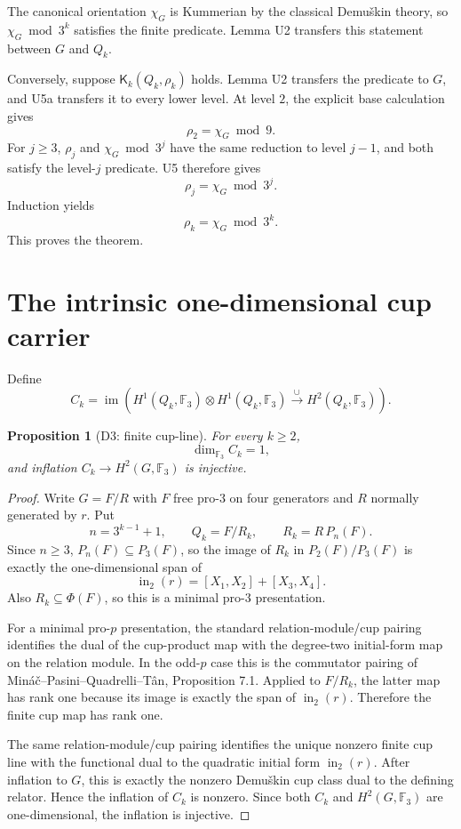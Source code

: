 \documentclass[11pt]{article}
\newtheorem{proposition}[theorem]{Proposition}
\begin{document}
The canonical orientation $\chi_G$ is Kummerian by the classical
Demu\v{s}kin theory, so $\chi_G\bmod3^k$ satisfies the finite predicate.
Lemma U2 transfers this statement between $G$ and $Q_k$.

Conversely, suppose $\mathsf K_k(Q_k,\rho_k)$ holds. Lemma U2 transfers
the predicate to $G$, and U5a transfers it to every lower level.
At level $2$, the explicit base calculation gives
\[
\rho_2=\chi_G\bmod9.
\]
For $j\ge3$, $\rho_j$ and $\chi_G\bmod3^j$ have the same reduction to
level $j-1$, and both satisfy the level-$j$ predicate. U5 therefore gives
\[
\rho_j=\chi_G\bmod3^j.
\]
Induction yields
\[
\rho_k=\chi_G\bmod3^k.
\]
This proves the theorem.

\section{The intrinsic one-dimensional cup carrier}

Define
\[
\boxed{
C_k=
\operatorname{im}\!\left(
H^1(Q_k,\mathbb F_3)\otimes H^1(Q_k,\mathbb F_3)
\xrightarrow{\cup}
H^2(Q_k,\mathbb F_3)
\right).
}
\]

\begin{proposition}[D3: finite cup-line]
For every $k\ge2$,
\[
\boxed{\dim_{\mathbb F_3}C_k=1,}
\]
and inflation $C_k\to H^2(G,\mathbb F_3)$ is injective.
\end{proposition}

\begin{proof}
Write $G=F/R$ with $F$ free pro-$3$ on four generators and $R$
normally generated by $r$. Put
\[
n=3^{k-1}+1,
\qquad
Q_k=F/R_k,
\qquad
R_k=R\,P_n(F).
\]
Since $n\ge3$, $P_n(F)\subseteq P_3(F)$, so the image of $R_k$ in
$P_2(F)/P_3(F)$ is exactly the one-dimensional span of
\[
\operatorname{in}_2(r)=[X_1,X_2]+[X_3,X_4].
\]
Also $R_k\subseteq\Phi(F)$, so this is a minimal pro-$3$ presentation.

For a minimal pro-$p$ presentation, the standard relation-module/cup
pairing identifies the dual of the cup-product map with the degree-two
initial-form map on the relation module. In the odd-$p$ case this is the
commutator pairing of Miná\v{c}--Pasini--Quadrelli--T\^an, Proposition 7.1.
Applied to $F/R_k$, the latter map has rank one because its image is
exactly the span of $\operatorname{in}_2(r)$. Therefore the finite cup
map has rank one.

The same relation-module/cup pairing identifies the unique nonzero
finite cup line with the functional dual to the quadratic initial form
$\operatorname{in}_2(r)$. After inflation to $G$, this is exactly the
nonzero Demu\v{s}kin cup class dual to the defining relator. Hence the
inflation of $C_k$ is nonzero. Since both $C_k$ and
$H^2(G,\mathbb F_3)$ are one-dimensional, the inflation is injective.
\end{proof}
\end{document}
